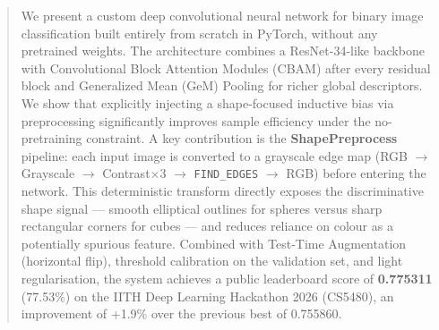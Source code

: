 \documentclass{article}
\theoremstyle{plain}
\theoremstyle{definition}
\theoremstyle{remark}
\begin{document}


\begin{abstract}
We present a custom deep convolutional neural network for binary image
classification built entirely from scratch in PyTorch, without any
pretrained weights.  The architecture combines a ResNet-34-like backbone
with Convolutional Block Attention Modules (CBAM) after every residual
block and Generalized Mean (GeM) Pooling for richer global descriptors. We show that explicitly injecting a shape-focused inductive bias via preprocessing significantly improves sample efficiency under the no-pretraining constraint.
A key contribution is the \textbf{ShapePreprocess} pipeline: each input
image is converted to a grayscale edge map
(RGB $\to$ Grayscale $\to$ Contrast$\times$3 $\to$ \texttt{FIND\_EDGES}
$\to$ RGB) before entering the network.  This deterministic transform
directly exposes the discriminative shape signal --- smooth elliptical
outlines for spheres versus sharp rectangular corners for cubes --- and
reduces reliance on colour as a potentially spurious feature.  Combined with Test-Time
Augmentation (horizontal flip), threshold calibration on the validation
set, and light regularisation, the system achieves a public leaderboard
score of \textbf{0.775311} (77.53\%) on the IITH Deep Learning
Hackathon 2026 (CS5480), an improvement of +1.9\% over the previous
best of 0.755860.
\end{abstract}
\end{document}
